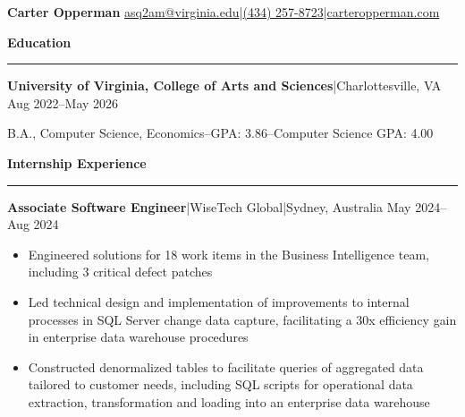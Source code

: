 \documentclass[11pt,letterpaper]{article}
\newcommand{\horibar}[2]{#1\hspace{5pt}|\hspace{5pt}#2}
\newcommand{\sep}[1]{\par\vspace{#1}}
\renewenvironment{section}[1]{
\sep{11pt}
{
\fontsize{14}{2}
\selectfont
\textbf{#1}\\[0.5pt]
}
\sep{6pt}
\noindent\rule{\linewidth}{0.5pt}
\sep{4pt}
}
{
}
\renewenvironment{subsection}[3]
{
\sep{4pt}
\horibar{\textbf{#1}}{#2} \hfill #3
\par\setstretch{1}
\begin{itemize}
}
{
\end{itemize}
\setstretch{0}
}
\begin{document}
{\fontsize{20}{1} \selectfont \textbf{Carter Opperman}} \hfill \horibar{\href{mailto:asq2am@virginia.edu}{asq2am@virginia.edu}}{\horibar{\href{tel:+14342578723}{(434) 257-8723}}{\href{https://carteropperman.com}{carteropperman.com}}}
\sep{5pt}

\begin{section}{Education}
    \sep{4pt}
    \horibar{\textbf{University of Virginia, College of Arts and Sciences}}{Charlottesville, VA} \hfill Aug 2022–May 2026
    \sep{4pt}
    \par\hspace{6pt}B.A., Computer Science, Economics\hspace{5pt}–\hspace{5pt}GPA: 3.86\hspace{5pt}–\hspace{5pt}Computer Science GPA: 4.00
    \sep{2pt}
\end{section}

\begin{section}{Internship Experience}
    \begin{subsection}{Associate Software Engineer}{\horibar{WiseTech Global}{Sydney, Australia}}{May 2024–Aug 2024}
        \item Engineered solutions for 18 work items in the Business Intelligence team, including 3 critical defect patches
        \item Led technical design and implementation of improvements to internal processes in SQL Server change data capture, facilitating a 30x efficiency gain in enterprise data warehouse procedures
        \item Constructed denormalized tables to facilitate queries of aggregated data tailored to customer needs, including SQL scripts for operational data extraction, transformation and loading into an enterprise data warehouse
    \end{subsection}
\end{section}
\end{document}
